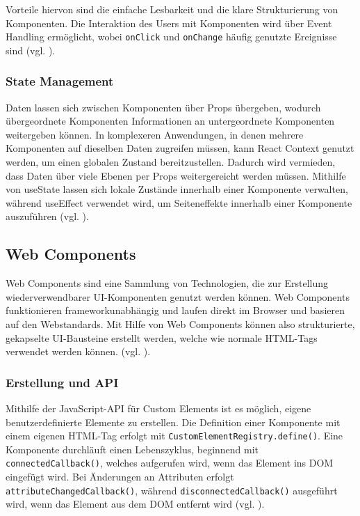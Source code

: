 \documentclass[oneside]{ausarbeitung}
\begin{document}
Vorteile hiervon sind die einfache Lesbarkeit und die klare Strukturierung von Komponenten.  
Die Interaktion des Users mit Komponenten wird über Event Handling ermöglicht, wobei \texttt{onClick} und \texttt{onChange} häufig genutzte Ereignisse sind (vgl. \parencite{react}).

\subsubsection{State Management}
Daten lassen sich zwischen Komponenten über Props übergeben, wodurch übergeordnete Komponenten Informationen an untergeordnete Komponenten weitergeben können. In komplexeren Anwendungen, in denen mehrere Komponenten auf dieselben Daten zugreifen müssen, kann React Context genutzt werden, um einen globalen Zustand bereitzustellen. Dadurch wird vermieden, dass Daten über viele Ebenen per Props weitergereicht werden müssen. Mithilfe von useState lassen sich lokale Zustände innerhalb einer Komponente verwalten, während useEffect verwendet wird, um Seiteneffekte innerhalb einer Komponente auszuführen (vgl. \parencite{react}).

\subsection{Web Components}
Web Components sind eine Sammlung von Technologien, die zur Erstellung wiederverwendbarer UI-Komponenten genutzt werden können. Web Components funktionieren frameworkunabhängig und laufen direkt im Browser und basieren auf den Webstandards. Mit Hilfe von Web Components können also strukturierte, gekapselte UI-Bausteine erstellt werden, welche wie normale HTML-Tags verwendet werden können. (vgl. \parencite{webcomponents}). 

\subsubsection{Erstellung und API}
Mithilfe der JavaScript-API für Custom Elements ist es möglich, eigene benutzerdefinierte Elemente zu erstellen. Die Definition einer Komponente mit einem eigenen HTML-Tag erfolgt mit \texttt{CustomElementRegistry.define()}. Eine Komponente durchläuft einen Lebenszyklus, beginnend mit \texttt{connectedCallback()}, welches aufgerufen wird, wenn das Element ins DOM eingefügt wird. Bei Änderungen an Attributen erfolgt \texttt{attributeChangedCallback()}, während \texttt{disconnectedCallback()} ausgeführt wird, wenn das Element aus dem DOM entfernt wird (vgl. \parencite{webcomponents}).
\end{document}
